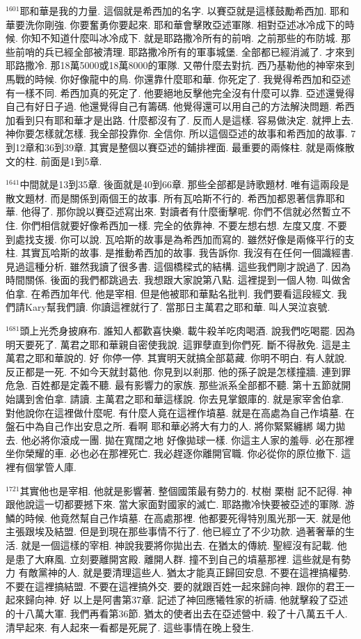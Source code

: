 \documentclass{book}
\begin{document}
$^{1601}$耶和華是我的力量.
這個就是希西加的名字.
以賽亞就是這樣鼓勵希西加.
耶和華要洗你剛強.
你要奮勇你要起來.
耶和華會擊敗亞述軍隊.
相對亞述冰冷成下的時候.
你知不知道什麼叫冰冷成下.
就是耶路撒冷所有的前哨.
之前那些的布防城.
那些前哨的兵已經全部被清理.
耶路撒冷所有的軍事城堡.
全部都已經消滅了.
才來到耶路撒冷.
那18萬5000或18萬8000的軍隊.
又帶什麼去對抗.
西乃基勒他的神宰來到馬戰的時候.
你好像龍中的鳥.
你還靠什麼耶和華.
你死定了.
我覺得希西加和亞述有一樣不同.
希西加真的死定了.
他要絕地反擊他完全沒有什麼可以靠.
亞述還覺得自己有好日子過.
他還覺得自己有籌碼.
他覺得還可以用自己的方法解決問題.
希西加看到只有耶和華才是出路.
什麼都沒有了.
反而人是這樣.
容易做決定.
就押上去.
神你要怎樣就怎樣.
我全部投靠你.
全信你.
所以這個亞述的故事和希西加的故事.
7到12章和36到39章.
其實是整個以賽亞述的鋪排裡面.
最重要的兩條柱.
就是兩條散文的柱.
前面是1到5章.

$^{1641}$中間就是13到35章.
後面就是40到66章.
那些全部都是詩歌題材.
唯有這兩段是散文題材.
而是關係到兩個王的故事.
所有瓦哈斯不行的.
希西加都恩著信靠耶和華.
他得了.
那你說以賽亞述寫出來.
對讀者有什麼衝擊呢.
你們不信就必然暫立不住.
你們相信就要好像希西加一樣.
完全的依靠神.
不要左想右想.
左度又度.
不要到處找支援.
你可以說.
瓦哈斯的故事是為希西加而寫的.
雖然好像是兩條平行的支柱.
其實瓦哈斯的故事.
是推動希西加的故事.
我告訴你.
我沒有在任何一個識經書.
見過這種分析.
雖然我讀了很多書.
這個橋樑式的結構.
這些我們剛才說過了.
因為時間關係.
後面的我們都跳過去.
我想跟大家說第八點.
這裡提到一個人物.
叫做舍伯拿.
在希西加年代.
他是宰相.
但是他被耶和華點名批判.
我們要看這段經文.
我們請Kary幫我們讀.
你讀這裡就行了.
當那日主萬君之耶和華.
叫人哭泣哀號.

$^{1681}$頭上光禿身披麻布.
誰知人都歡喜快樂.
載牛殺羊吃肉喝酒.
說我們吃喝罷.
因為明天要死了.
萬君之耶和華親自密使我說.
這罪孽直到你們死.
斷不得赦免.
這是主萬君之耶和華說的.
好 你停一停.
其實明天就搞全部葛藏.
你明不明白.
有人就說.
反正都是一死.
不如今天就封葛他.
你見到以剎那.
他的孫子說是怎樣撞牆.
連到罪危急.
百姓都是定義不聽.
最有影響力的家族.
那些派系全部都不聽.
第十五節就開始講到舍伯拿.
請讀.
主萬君之耶和華這樣說.
你去見掌銀庫的.
就是家宰舍伯拿.
對他說你在這裡做什麼呢.
有什麼人竟在這裡作墳墓.
就是在高處為自己作墳墓.
在盤石中為自己作出安息之所.
看啊 耶和華必將大有力的人.
將你緊緊纏綁 竭力拋去.
他必將你滾成一團.
拋在寬闊之地 好像拋球一樣.
你這主人家的羞辱.
必在那裡坐你榮耀的車.
必也必在那裡死亡.
我必趕逐你離開官職.
你必從你的原位撤下.
這裡有個掌管人庫.

$^{1721}$其實他也是宰相.
他就是影響著.
整個國策最有勢力的.
杖樹 栗樹 記不記得.
神跟他說這一切都要撼下來.
當大家面對國家的滅亡.
耶路撒冷快要被亞述的軍隊.
游鱗的時候.
他竟然幫自己作墳墓.
在高處那裡.
他都要死得特別風光那一天.
就是他主張跟埃及結盟.
但是到現在那些事情不行了.
他已經立了不少功款.
過著奢華的生活.
就是一個這樣的宰相.
神說我要將你拋出去.
在猶太的傳統.
聖經沒有記載.
他是患了大麻風.
立刻要離開宮殿.
離開人群.
撞不到自己的墳墓那裡.
這些就是有勢力 有敵黨神的人.
就是要清理這些人.
猶太才能真正歸回安息.
不要在這裡搞權勢.
不要在這裡搞結盟.
不要在這裡搞外交.
要的就跟百姓一起來歸向神.
跟你的君王一起來歸向神.
好 以上是阿書第37章.
記述了神回應犧牲家的祈禱.
他就擊殺了亞述的十八萬大軍.
我們再看第36節.
猶太的使者出去在亞述營中.
殺了十八萬五千人.
清早起來.
有人起來一看都是死屍了.
這些事情在晚上發生.
\end{document}
